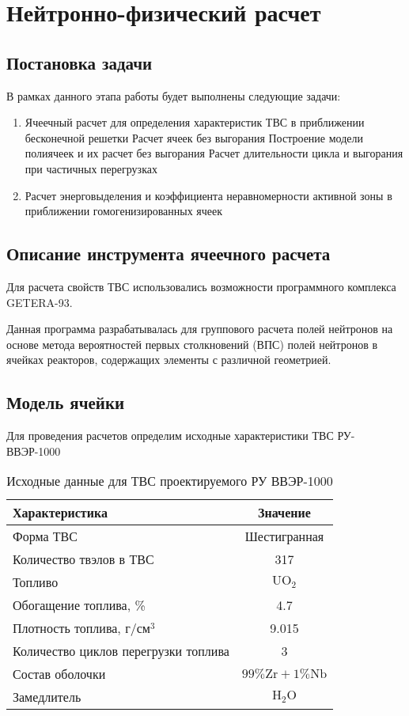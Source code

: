 \section{Нейтронно-физический расчет}

\subsection{Постановка задачи}
В рамках данного этапа работы будет выполнены следующие задачи:
\begin{enumerate}
    \item Ячеечный расчет для определения характеристик ТВС в приближении бесконечной решетки
        \subitem Расчет ячеек без выгорания
        \subitem Построение модели полиячеек и их расчет без выгорания
        \subitem Расчет длительности цикла и выгорания при частичных перегрузках
    \item Расчет энерговыделения и коэффициента неравномерности активной зоны в приближении гомогенизированных ячеек
\end{enumerate}

\subsection{Описание инструмента ячеечного расчета}
Для расчета свойств ТВС использовались возможности программного комплекса GETERA-93.

Данная программа разрабатывалась для группового расчета полей нейтронов на основе метода вероятностей первых столкновений (ВПС) полей нейтронов в ячейках реакторов, содержащих элементы с различной геометрией.
\subsection{Модель ячейки}
Для проведения расчетов определим исходные характеристики ТВС РУ-ВВЭР-1000

\begin{table}[H]
	\caption{Исходные данные для ТВС проектируемого РУ ВВЭР-1000}
	\begin{center}
        \begin{tabular}{|l|c|}
        \toprule
         Характеристика & Значение \\ 
         \midrule
          Форма ТВС & Шестигранная\\
         \hline
          Количество твэлов в ТВС & 317\\
         \hline
         Топливо & $\text{U}\text{O}_2$ \\
         \hline
         Обогащение топлива, \%& 4.7 \\
         \hline
         Плотность топлива, $\text{г}/\text{см}^3$ & 9.015 \\
         \hline
         Количество циклов перегрузки топлива & 3 \\
         \hline
         Состав оболочки & $99\% \text{Zr} + 1 \% \text{Nb}$ \\
         \hline
         Замедлитель & $\text{H}_2\text{O}$ \\
         \bottomrule
		\end{tabular}
		\label{tabular:neutron_in}
	\end{center}
\end{table}
